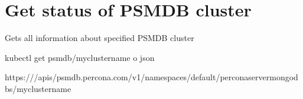 \documentclass[letterpaper,10pt,english]{sphinxmanual}
\begin{document}
\begin{sphinxVerbatim}[commandchars=\\\{\}]





               \PYG{p}{]}
   \PYG{p}{]}
\end{sphinxVerbatim}


\section{Get status of PSMDB cluster}
\label{\detokenize{api:get-status-of-psmdb-cluster}}

\begin{sphinxVerbatim}[commandchars=\\\{\}]
Gets all information about specified PSMDB cluster
\end{sphinxVerbatim}


\begin{sphinxVerbatim}[commandchars=\\\{\}]
kubectl get psmdb/my\PYGZhy{}cluster\PYGZhy{}name \PYGZhy{}o json
\end{sphinxVerbatim}


\begin{sphinxVerbatim}[commandchars=\\\{\}]
https:///apis/psmdb.percona.com/v1/namespaces/default/perconaservermongodbs/my\PYGZhy{}cluster\PYGZhy{}name
\end{sphinxVerbatim}
\end{document}
